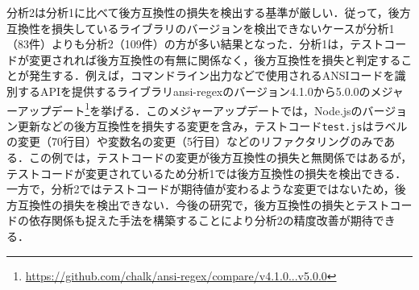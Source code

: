 \documentclass[submit]{ipsj}
\newcommand{\todo}[1]{\colorbox{yellow}{{\bf TODO}:}{\color{red} {\textbf{[#1]}}}}
\begin{document}
{分析2は分析1に比べて後方互換性の損失を検出する基準が厳しい．従って，後方互換性を損失しているライブラリのバージョンを検出できないケースが分析1（83件）よりも分析2（109件）の方が多い結果となった．分析1は，テストコードが変更されれば後方互換性の有無に関係なく，後方互換性を損失と判定することが発生する．例えば，コマンドライン出力などで使用されるANSIコードを識別するAPIを提供するライブラリansi-regexのバージョン4.1.0から5.0.0のメジャーアップデート\footnote{\url{https://github.com/chalk/ansi-regex/compare/v4.1.0...v5.0.0}}を挙げる．このメジャーアップデートでは，Node.jsのバージョン更新などの後方互換性を損失する変更を含み，テストコード\verb|test.js|はラベルの変更（70行目）や変数名の変更（5行目）などのリファクタリングのみである．この例では，テストコードの変更が後方互換性の損失と無関係ではあるが，テストコードが変更されているため分析1では後方互換性の損失を検出できる．一方で，分析2ではテストコードが期待値が変わるような変更ではないため，後方互換性の損失を検出できない．今後の研究で，後方互換性の損失とテストコードの依存関係も捉えた手法を構築することにより分析2の精度改善が期待できる．





}
\end{document}
